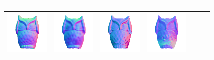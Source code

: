 \begin{figure}
\noindent\rule{0.95\linewidth}{0.4pt}
\newcommand{\reswidth}{0.141}
\begin{tabular*}{\linewidth}{@{}c@{}c@{}c@{}c@{}c@{}c@{}c@{}}
\includegraphics[width=\reswidth\linewidth]{figures/results/examples/gt_owlie_normals.png} &
\includegraphics[width=\reswidth\linewidth]{figures/results/examples/ours_owlie_normals.png} &
\includegraphics[width=\reswidth\linewidth]{figures/results/examples/jung_owlie_normals.png} &
\includegraphics[width=\reswidth\linewidth]{figures/results/examples/yu_owlie_normals.png} &

\end{tabular*}
\end{figure}
